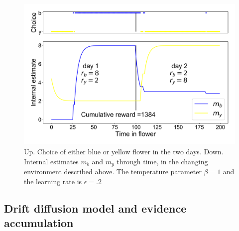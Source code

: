 \documentclass{article}
\begin{document}
\begin{figure}[H]
\centering
\includegraphics[width=.8\linewidth]{fig2_report12.png}
\caption[growing population]{Up. Choice of either blue or yellow flower in the two days. Down. Internal estimates $m_b$ and $m_y$ through time, in the changing environment described above. The temperature parameter $\beta = 1$ and the learning rate is $\epsilon = .2$}\label{fig:fig9}
\end{figure}
 \subsection{Drift diffusion model and evidence accumulation}
\end{document}
